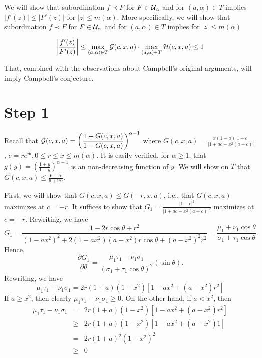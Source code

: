 \documentclass[12pt]{article}
\newcommand{\cU}{{\cal{U}}}
\newcommand{\ds}{\displaystyle}
\begin{document}
\noindent We will show that subordination $f \prec F$ for  $F \in \cU_\alpha$ and for $(a,\alpha) \in T$ implies $|f'(z)| \le |F'(z)|$ for $|z| \le m(\alpha)$.  
More specifically, we will show that subordination $f \prec F$ for  $F \in \cU_\alpha$ and for $(a,\alpha) \in T$ 
implies for $|z| \le m(\alpha)$

\begin{equation} \label{fund-new}
\left | \frac{f'(z)}{F'(z)}\right | \le  \max_{(a,\alpha)\in T}{\cal G}(c,x,a) \cdot \max_{(a,\alpha)\in T}{\cal H}(c,x,a) \le 1
\end{equation}

\noindent That, combined with the observations about Campbell's original arguments, will imply Campbell's conjecture.


\section{Step 1}

Recall that ${\ds {\cal G}(c,x,a) = \left ( \frac{1+G(c,x,a)}{1-G(c,x,a)} \right ) ^{\alpha-1}}$ where  
${\ds G(c,x,a) = \frac{x(1-a)|1-c|}{|1+ac-x^2(a+c)|}}$, $c = re^{i\theta}, 0 \le r \le x \le m(\alpha)$. 
It is easily verified, for $\alpha \ge 1$, that 
${\ds g(y) = \left ( \frac{1+y}{1-y} \right ) ^{\alpha-1}}$  is an non-decreasing function of $y$.  
We will show on $T$ that ${\ds G(c,x,a) \le \frac{6-\alpha}{6+9\alpha}}$.

\vspace{0.2in}

First, we will show that ${ G}(c,x,a) \le { G}(-r,x,a)$, i.e., that ${ G}(c,x,a)$ maximizes at $c = -r$.  
It suffices to show that ${\ds G_1 = \frac{|1-c|^2}{|1+ac-x^2(a+c)|^2}}$ maximizes at $c = -r$.  
Rewriting, we have 
$$
G_1 = \frac{1-2r\cos\theta + r^2}{(1-ax^2)^2 + 2(1-ax^2)(a-x^2)r\cos\theta + (a-x^2)^2r^2} = \frac{\mu_1 + \nu_1 \cos\theta}{\sigma_1 + \tau_1 \cos \theta}.
$$
Hence, 
$$
\frac{\partial G_1}{\partial \theta} = \frac{\mu_1\tau_1 - \nu_1\sigma_1}{(\sigma_1 + \tau_1 \cos\theta)^2}(\sin\theta).
$$
Rewriting, we have
$$
\mu_1\tau_1 - \nu_1\sigma_1 = 2r(1+a)(1-x^2)[1-ax^2 + (a-x^2)r^2]
$$
If $a \ge x^2$, then clearly $\mu_1\tau_1 - \nu_1\sigma_1 \ge 0$.  On the other hand, if $a < x^2$, then
\begin{eqnarray*}
\mu_1\tau_1 - \nu_1\sigma_1 &=& 2r(1+a)(1-x^2)[1-ax^2 + (a-x^2)r^2] \\
                    &\ge& 2r(1+a)(1-x^2)[1-ax^2 + (a-x^2)1] \\
                    &=& 2r (1+a)^2(1-x^2)^2 \\
                    &\ge& 0
\end{eqnarray*}
\end{document}
